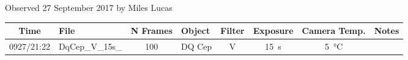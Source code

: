 \caption{Observed 27 September 2017 by Miles Lucas}
\begin{tabular}{clclcccl}
	\hline
	Time  & File            & N Frames & Object & Filter &     Exposure     &      Camera Temp.      & Notes \\ \hline\hline
	0927/21:22 & DqCep\_V\_15s\_ &   100    & DQ Cep &   V    & \SI{15}{\second} & \SI{5}{\degreeCelsius} &  \\ \hline
\end{tabular}